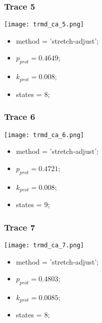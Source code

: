 \subsubsection{Trace 5}
\begin{minipage}[c]{0.7\textwidth}
    \texttt{[image: trmd\_ca\_5.png]}
\end{minipage}
\hfill
\begin{minipage}[c]{0.45\textwidth}
    \begin{itemize}
        \item method = 'stretch-adjust';
        \item $p_{prot}=0.4649$;
        \item $k_{prot}=0.008$;
        \item states = 8;
    \end{itemize}
\end{minipage}

\subsubsection{Trace 6}
\begin{minipage}[c]{0.7\textwidth}
    \texttt{[image: trmd\_ca\_6.png]}
\end{minipage}
\hfill
\begin{minipage}[c]{0.45\textwidth}
    \begin{itemize}
        \item method = 'stretch-adjust';
        \item $p_{prot}=0.4721$;
        \item $k_{prot}=0.008$;
        \item states = 9;
    \end{itemize}
\end{minipage}

\subsubsection{Trace 7}
\begin{minipage}[c]{0.7\textwidth}
    \texttt{[image: trmd\_ca\_7.png]}
\end{minipage}
\hfill
\begin{minipage}[c]{0.45\textwidth}
    \begin{itemize}
        \item method = 'stretch-adjust';
        \item $p_{prot}=0.4803$;
        \item $k_{prot}=0.0085$;
        \item states = 8;
    \end{itemize}
\end{minipage}

